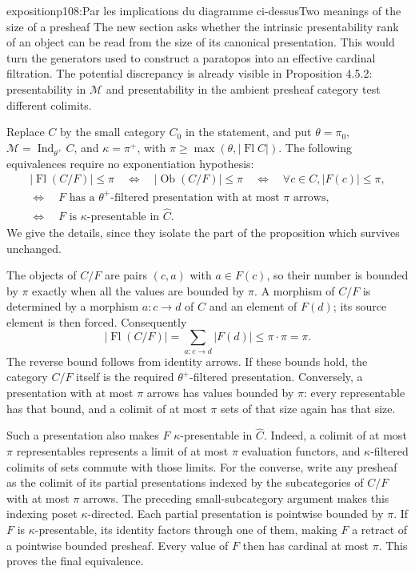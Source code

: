 \begin{dcomment}{exposition}{p108:Par les implications du diagramme ci-dessus}{Two meanings of the size of a presheaf}
The new section asks whether the intrinsic presentability rank of an object can be read from the size of its canonical presentation. This would turn the generators used to construct a paratopos into an effective cardinal filtration. The potential discrepancy is already visible in Proposition 4.5.2: presentability in $\mathcal M$ and presentability in the ambient presheaf category test different colimits.

Replace $C$ by the small category $C_0$ in the statement, and put $\theta=\pi_0$, $\mathcal M=\operatorname{Ind}_{\theta^+}C$, and $\kappa=\pi^+$, with $\pi\geq\max(\theta,|\operatorname{Fl}C|)$. The following equivalences require no exponentiation hypothesis:
\[
\begin{gathered}
|\operatorname{Fl}(C/F)|\leq\pi
\quad\Longleftrightarrow\quad
|\operatorname{Ob}(C/F)|\leq\pi
\quad\Longleftrightarrow\quad
\forall c\in C, |F(c)|\leq\pi,\\
\Longleftrightarrow\quad
F\text{ has a }\theta^+\text{-filtered presentation with at most }\pi\text{ arrows},\\
\Longleftrightarrow\quad
F\text{ is }\kappa\text{-presentable in }\widehat C.
\end{gathered}
\]
We give the details, since they isolate the part of the proposition which survives unchanged.

The objects of $C/F$ are pairs $(c,a)$ with $a\in F(c)$, so their number is bounded by $\pi$ exactly when all the values are bounded by $\pi$. A morphism of $C/F$ is determined by a morphism $a:c\to d$ of $C$ and an element of $F(d)$; its source element is then forced. Consequently
\[
|\operatorname{Fl}(C/F)|
=\sum_{a:c\to d}|F(d)|\leq\pi\cdot\pi=\pi.
\]
The reverse bound follows from identity arrows. If these bounds hold, the category $C/F$ itself is the required $\theta^+$-filtered presentation. Conversely, a presentation with at most $\pi$ arrows has values bounded by $\pi$: every representable has that bound, and a colimit of at most $\pi$ sets of that size again has that size.

Such a presentation also makes $F$ $\kappa$-presentable in $\widehat C$. Indeed, a colimit of at most $\pi$ representables represents a limit of at most $\pi$ evaluation functors, and $\kappa$-filtered colimits of sets commute with those limits. For the converse, write any presheaf as the colimit of its partial presentations indexed by the subcategories of $C/F$ with at most $\pi$ arrows. The preceding small-subcategory argument makes this indexing poset $\kappa$-directed. Each partial presentation is pointwise bounded by $\pi$. If $F$ is $\kappa$-presentable, its identity factors through one of them, making $F$ a retract of a pointwise bounded presheaf. Every value of $F$ then has cardinal at most $\pi$. This proves the final equivalence.


\end{dcomment}
